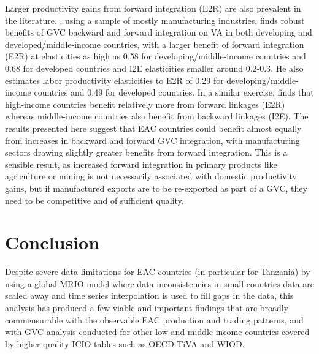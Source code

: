 \documentclass[a4paper]{article}
\begin{document}
Larger productivity gains from forward integration (E2R) are also prevalent in the literature. \citet{Kummritz20161}, using a sample of mostly manufacturing industries, finds robust benefits of GVC backward and forward integration on VA in both developing and developed/middle-income countries, with a larger benefit of forward integration (E2R) at elasticities as high as 0.58 for developing/middle-income countries and 0.68 for developed countries and I2E elasticities smaller around 0.2-0.3. He also estimates labor productivity elasticities to E2R of 0.29 for developing/middle-income countries and 0.49 for developed countries. In a similar exercise, \citet{kummritz2015global} finds that high-income countries benefit relatively more from forward linkages (E2R) whereas middle-income countries also benefit from backward linkages (I2E). The results presented here suggest that EAC countries could benefit almost equally from increases in backward and forward GVC integration, with manufacturing sectors drawing slightly greater benefits from forward integration. 
This is a sensible result, as increased forward integration in primary products like agriculture or mining is not necessarily associated with domestic productivity gains, but if manufactured exports are to be re-exported as part of a GVC, they need to be competitive and of sufficient quality.  %



\section{Conclusion} 

Despite severe data limitations for EAC countries (in particular for Tanzania) by using a global MRIO model where data inconsistencies in small countries data are scaled away and time series interpolation is used to fill gaps in the data, this analysis has produced a few viable and important findings that are broadly commensurable with the observable EAC production and trading patterns, and with GVC analysis conducted for other low-and middle-income countries covered by higher quality ICIO tables such as OECD-TiVA and WIOD. \newline
\end{document}
